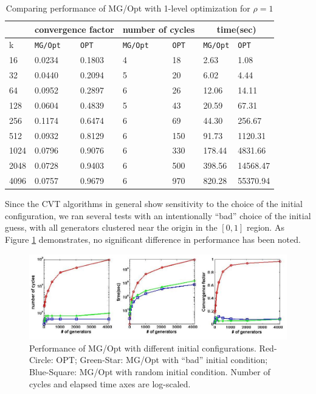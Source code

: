 \documentclass{siamltex}
\begin{document}
\begin{table}
\begin{center}
\begin{tabular}{|l||l|l||l|l||l|l|} \hline
 &\multicolumn{2}{|c|}{convergence factor} &\multicolumn{2}{|c|}{number of cycles} &\multicolumn{2}{|c|}{time(sec)}\\ \hline
k& {\tt MG/Opt}&{\tt OPT}&{\tt MG/Opt}&{\tt OPT}&{\tt MG/Opt}&{\tt OPT}\\ \hline
16&0.0234&0.1803&4&18&2.63&1.08\\ \hline
32&0.0440&0.2094&5&20&6.02&4.44 \\ \hline
64&0.0952&0.2897&6&26&12.06&14.11 \\ \hline
128&0.0604&0.4839&5&43 &20.59&67.31\\ \hline
256&0.1174&0.6474&6&69&44.30&256.67 \\ \hline
512&0.0932&0.8129&6&150&91.73&1120.31 \\ \hline
1024&0.0796&0.9076&6&330&178.44&4831.66 \\ \hline
2048&0.0728&0.9403&6&500&398.56&14568.47 \\ \hline
4096&0.0757&0.9679&6&970&820.28&55370.94\\ \hline
 \end{tabular}
\end{center}
\caption{Comparing performance of MG/Opt with 1-level optimization for $\rho=1$ }
\label{unitable}
\end{table}

Since the CVT algorithms in general show sensitivity 
to the choice of the initial configuration, we ran several tests with an intentionally ``bad'' %
choice of the initial guess, with all generators clustered near the origin in the $[0,1]$ region. As Figure \ref{fig:bad} demonstrates, no significant difference in performance has been noted.

\begin{figure}[h]
\centering
  \includegraphics[width=1.0\textwidth]{uniopt_mg_bad_ini1}
  \caption{Performance of MG/Opt with different initial configurations. Red-Circle: OPT; Green-Star: MG/Opt with ``bad'' initial condition; Blue-Square: MG/Opt with random initial condition. Number of cycles and elapsed time axes are log-scaled.}
\label{fig:bad}
\end{figure}
\end{document}
